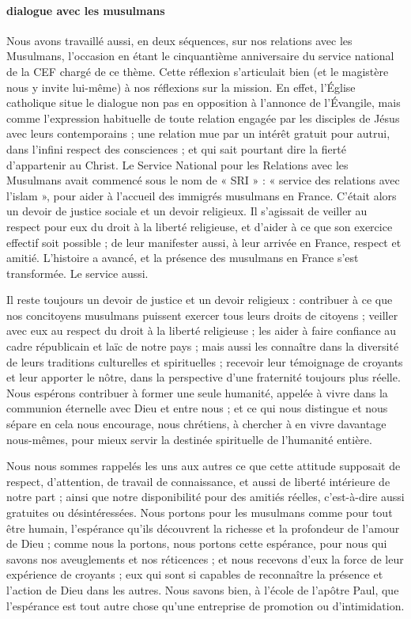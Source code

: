 \paragraph{dialogue avec les musulmans}
Nous avons travaillé aussi, en deux séquences, sur nos relations avec les Musulmans, l’occasion en étant le cinquantième anniversaire du service national de la CEF chargé de ce thème. Cette réflexion s’articulait bien (et le magistère nous y invite lui-même) à nos réflexions sur la mission. En effet, l’Église catholique situe le dialogue non pas en opposition à l’annonce de l’Évangile, mais comme l’expression habituelle de toute relation engagée par les disciples de Jésus avec leurs contemporains ; une relation mue par un intérêt gratuit pour autrui, dans l’infini respect des consciences ; et qui sait pourtant dire la fierté d’appartenir au Christ.
Le Service National pour les Relations avec les Musulmans avait commencé sous le nom de « SRI » :
« service des relations avec l’islam », pour aider à l’accueil des immigrés musulmans en France. C’était alors un devoir de justice sociale et un devoir religieux. Il s’agissait de veiller au respect pour eux du droit à la liberté religieuse, et d’aider à ce que son exercice effectif soit possible ; de leur manifester aussi, à leur arrivée en France, respect et amitié. L’histoire a avancé, et la présence des musulmans en France s’est transformée. Le service aussi.

Il reste toujours un devoir de justice et un devoir religieux : contribuer à ce que nos concitoyens musulmans puissent exercer tous leurs droits de citoyens ; veiller avec eux au respect du droit à la liberté religieuse ; les aider à faire confiance au cadre républicain et laïc de notre pays ; mais aussi les connaître dans la diversité de leurs traditions culturelles et spirituelles ; recevoir leur témoignage de croyants et leur apporter le nôtre, dans la perspective d’une fraternité toujours plus réelle. Nous espérons contribuer à former une seule humanité, appelée à vivre dans la communion éternelle avec
 Dieu et entre nous ; et ce qui nous distingue et nous sépare en cela nous encourage, nous chrétiens, à chercher à en vivre davantage nous-mêmes, pour mieux servir la destinée spirituelle de l’humanité entière.

 
Nous nous sommes rappelés les uns aux autres ce que cette attitude supposait de respect, d’attention, de travail de connaissance, et aussi de liberté intérieure de notre part ; ainsi que notre disponibilité pour des amitiés réelles, c’est-à-dire aussi gratuites ou désintéressées. Nous portons pour les musulmans comme pour tout être humain, l’espérance qu’ils découvrent la richesse et la profondeur de l’amour de Dieu ; comme nous la portons, nous portons cette espérance, pour nous qui savons nos aveuglements et nos réticences ; et nous recevons d’eux la force de leur expérience de croyants ; eux qui sont si capables de reconnaître la présence et l’action de Dieu dans les autres. Nous savons bien, à l’école de l’apôtre Paul, que l’espérance est tout autre chose qu’une entreprise de promotion ou d’intimidation. 
